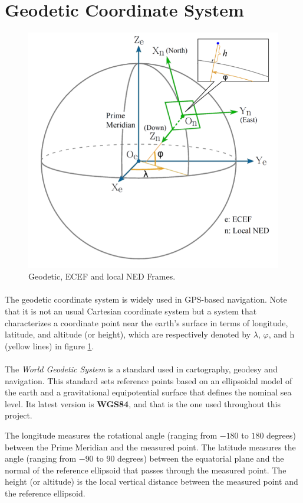 \section{Geodetic Coordinate System}\label{sec:coord}

\begin{figure}[H]
   \centering
    \includegraphics[width=.70\textwidth]{figures/GeoTemp1.png} 
    \caption{Geodetic, ECEF and local NED Frames.}  
    \label{fig:Geodetic1}
\end{figure}

\paragraph{}The geodetic coordinate system is widely used in GPS-based navigation. Note that it is not an usual Cartesian coordinate system but a system that characterizes a coordinate point near the earth’s surface in terms of longitude, latitude, and altitude (or height), which are respectively denoted by $\lambda$, $\varphi$, and h (yellow lines) in figure \ref{fig:Geodetic1}.

\paragraph{}The \textit{World Geodetic System} is a standard used in cartography, geodesy and navigation. This standard sets reference points based on an ellipsoidal model of the earth and a gravitational equipotential surface that defines the nominal sea level. Its latest version is \textbf{WGS84}, and that is the one used throughout this project. 

The longitude measures the rotational angle (ranging from $-180$ to $180$ degrees) between the Prime Meridian and the measured point. The latitude measures the angle (ranging from $-90$ to $90$ degrees) between the equatorial plane and the normal of the reference ellipsoid that passes through the measured point. The height (or altitude) is the local vertical distance between the measured point and the reference ellipsoid.

